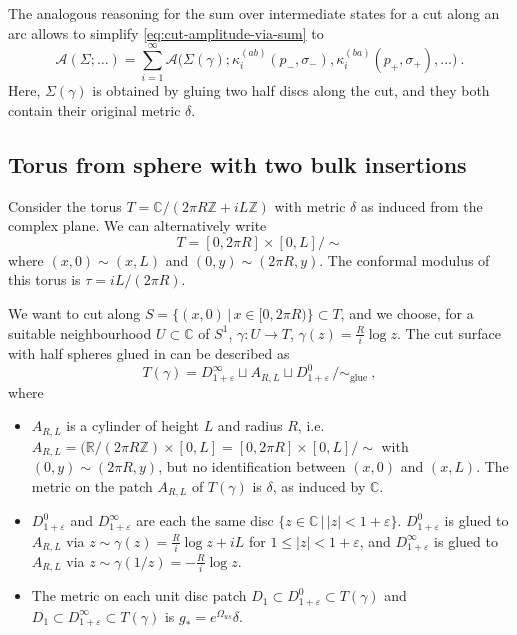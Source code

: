 \documentclass[11pt,a4paper]{article}
\numberwithin{equation}{section}
\begin{document}
The analogous reasoning for the sum over intermediate states for a cut along an arc allows to simplify \eqref{eq:cut-amplitude-via-sum} to 
\begin{equation}
     \mathcal{A}(\Sigma;\dots) 
=
     \sum_{i=1}^\infty \mathcal{A}\big(\Sigma(\gamma); \kappa^{(ab)}_i(p_-,\sigma_-), \kappa^{(ba)}_i(p_+,\sigma_+) , \dots \big) \ .
    \label{eq:cut-amplitude-via-sum-simpl}
\end{equation}
Here, $\Sigma(\gamma)$ is obtained by gluing two half discs along the cut, and they both contain their original metric $\delta$.



\subsection{Torus from sphere with two bulk insertions}

Consider the torus $T = \mathbb{C} / (2 \pi R \mathbb{Z} + i L \mathbb{Z})$ with metric $\delta$ as induced from the complex plane. We can alternatively write
\begin{equation}
    T = [0,2 \pi R] \times [0,L] / \sim
\end{equation}
where $(x,0) \sim (x,L)$ and $(0,y) \sim (2 \pi R,y)$. The conformal modulus of this torus is $\tau = i L / (2 \pi R)$.

We want to cut along $S = \{ (x,0) \,|\, x\in [0,2\pi R) \} \subset T$, and we choose, for a suitable neighbourhood $U \subset \mathbb{C}$ of $S^1$, $\gamma : U \to T$, $\gamma(z) = \frac{R}{i}\log z$. The cut surface with half spheres glued in can be described as
\begin{equation}
    T(\gamma) = D_{1+\varepsilon}^\infty \sqcup A_{R,L} \sqcup D_{1+\varepsilon}^0  \,/ \sim_\text{glue} \ ,
\end{equation}
where
\begin{itemize}
    \item $A_{R,L}$ is a cylinder of height $L$ and radius $R$, i.e.\ $A_{R,L} = (\mathbb{R} / (2 \pi R \mathbb{Z}) \times [0,L] = [0,2 \pi R] \times [0,L] / \sim$ with $(0,y) \sim (2 \pi R,y)$, but no identification between $(x,0)$ and $(x,L)$.
    The metric on the patch $A_{R,L}$ of $T(\gamma)$ is $\delta$, as induced by $\mathbb{C}$.

    \item $D_{1+\varepsilon}^0$ and $D_{1+\varepsilon}^\infty$ are each the same disc $\{ z \in \mathbb{C} \,|\, |z| < 1+\varepsilon \}$. $D_{1+\varepsilon}^0$ is glued to $A_{R,L}$ via $z \sim \gamma(z) = \frac{R}{i}\log z+iL$ for $1 \le |z| < 1+\varepsilon$, and  $D_{1+\varepsilon}^\infty$ is glued to $A_{R,L}$ via $z \sim \gamma(1/z) = -\frac{R}{i}\log z$. 

    \item The metric on each unit disc patch $D_1 \subset D_{1+\varepsilon}^{0} \subset T(\gamma)$ and $D_1 \subset D_{1+\varepsilon}^{\infty} \subset T(\gamma)$ is $g_* = e^{\Omega_{us}}\delta$.
\end{itemize}
\end{document}
